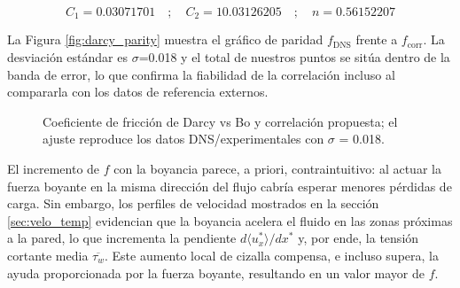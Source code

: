 \begin{small}
$$
C_1 = 0.03071701 \quad ; \quad C_2 = 10.03126205 \quad ; \quad n = 0.56152207
$$
\end{small}

La Figura \ref{fig:darcy_parity} muestra el gráfico de paridad $f_{\text{DNS}}$ frente a $f_{\text{corr}}$. La desviación estándar es $\sigma$=0.018 y el total de nuestros puntos se sitúa dentro de la banda de error, lo que confirma la fiabilidad de la correlación incluso al compararla con los datos de referencia externos.

\begin{figure}[H]
  \centering
  \caption{Coeficiente de fricción de Darcy vs Bo y correlación propuesta; el ajuste reproduce los datos DNS/experimentales con $\sigma$ = 0.018.}
  \label{fig:nusselt}
\end{figure}

El incremento de $f$ con la boyancia parece, a priori, contraintuitivo: al actuar la fuerza boyante en la misma dirección del flujo cabría esperar menores pérdidas de carga. Sin embargo, los perfiles de velocidad mostrados en la sección \ref{sec:velo_temp} evidencian que la boyancia acelera el fluido en las zonas próximas a la pared, lo que incrementa la pendiente $d \langle u^*_x \rangle / dx^*$ y, por ende, la tensión cortante media $\overline{\tau_w}$. Este aumento local de cizalla compensa, e incluso supera, la ayuda proporcionada por la fuerza boyante, resultando en un valor mayor de $f$.


